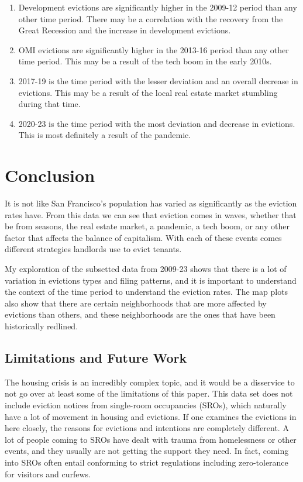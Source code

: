 \documentclass{article}\usepackage[]{graphicx}\usepackage[]{xcolor}
\begin{document}
\begin{enumerate}
    \item Development evictions are significantly higher in the 2009-12 period than any other time period. There may be a correlation with the recovery from the Great Recession and the increase in development evictions.
    \item OMI evictions are significantly higher in the 2013-16 period than any other time period. This may be a result of the tech boom in the early 2010s.
    \item 2017-19 is the time period with the lesser deviation and an overall decrease in evictions. This may be a result of the local real estate market stumbling during that time.
    \item 2020-23 is the time period with the most deviation and decrease in evictions. This is most definitely a result of the pandemic.
\end{enumerate}

\section{Conclusion}
It is not like San Francisco's population has varied as significantly as the eviction rates have. From this data we can see that eviction comes in waves, whether that be from seasons, the real estate market, a pandemic, a tech boom, or any other factor that affects the balance of capitalism. With each of these events comes different strategies landlords use to evict tenants.

My exploration of the subsetted data from 2009-23 shows that there is a lot of variation in evictions types and filing patterns, and it is important to understand the context of the time period to understand the eviction rates. The map plots also show that there are certain neighborhoods that are more affected by evictions than others, and these neighborhoods are the ones that have been historically redlined.

\subsection{Limitations and Future Work}
The housing crisis is an incredibly complex topic, and it would be a disservice to not go over at least some of the limitations of this paper. This data set does not include eviction notices from single-room occupancies (SROs), which naturally have a lot of movement in housing and evictions. If one examines the evictions in here closely, the reasons for evictions and intentions are completely different. A lot of people coming to SROs have dealt with trauma from homelessness or other events, and they usually are not getting the support they need. In fact, coming into SROs often entail conforming to strict regulations including zero-tolerance for visitors and curfews.
\end{document}
